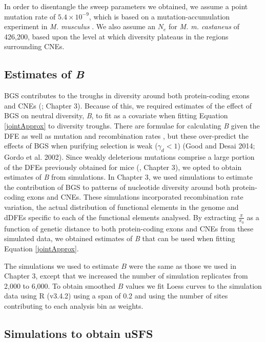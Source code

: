 \documentclass[11pt]{article}
\begin{document}
	In order to disentangle the sweep parameters we obtained, we assume a point mutation rate of $5.4 \times 10^{-9}$, which is based on a mutation-accumulation experiment in \textit{M. musculus} \citep{RN228}.	We also assume an $N_e$ for \textit{M. m. castaneus} of 426,200, based upon the level at which diversity plateaus in the regions surrounding CNEs.

	\subsection*{Estimates of \textit{B}} 
 
 	BGS contributes to the troughs in diversity around both protein-coding exons and CNEs (\citealt{RN122}; Chapter 3). Because of this, we required estimates of the effect of BGS on neutral diversity, \textit{B}, to fit as a covariate when fitting Equation \ref{jointApprox} to diversity troughs. There are formulae for calculating \textit{B} given the DFE as well as mutation and recombination rates \citep{RN157, RN206}, but these over-predict the effects of BGS when purifying selection is weak ($\gamma_d < 1$) (Good and Desai 2014; Gordo et al. 2002). Since weakly deleterious mutations comprise a large portion of the DFEs previously obtained for mice (\citealt{RN122}, Chapter 3), we opted to obtain estimates of \textit{B} from simulations. In Chapter 3, we used simulations to estimate the contribution of BGS to patterns of nucleotide diversity around both protein-coding exons and CNEs. These simulations incorporated recombination rate variation, the actual distribution of functional elements in the genome and dDFEs specific to each of the functional elements analysed. By extracting $\frac{\pi}{\pi_0}$ as a function of genetic distance to both protein-coding exons and CNEs from these simulated data, we obtained estimates of \textit{B} that can be used when fitting Equation \ref{jointApprox}.
 	
 	The simulations we used to estimate $B$ were the same as those we used in Chapter 3, except that we increased the number of simulation replicates from 2,000 to 6,000. To obtain smoothed $B$ values we fit Loess curves to the simulation data using R (v3.4.2) using a span of 0.2 and using the number of sites contributing to each analysis bin as weights.

	\subsection*{Simulations to obtain uSFS}
	
\end{document}
